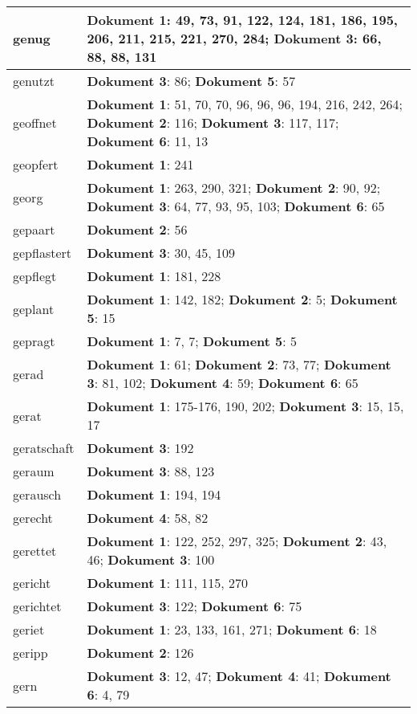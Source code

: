 \documentclass[a5paper]{article}
\begin{document}
\begin{longtable}[l]{|l|p{3in}|}
\hline
genug & \textbf{Dokument 1}: 49, 73, 91, 122, 124, 181, 186, 195, 206, 211, 215, 221, 270, 284; \textbf{Dokument 3}: 66, 88, 88, 131 \\
\hline
genutzt & \textbf{Dokument 3}: 86; \textbf{Dokument 5}: 57 \\
\hline
geoffnet & \textbf{Dokument 1}: 51, 70, 70, 96, 96, 96, 194, 216, 242, 264; \textbf{Dokument 2}: 116; \textbf{Dokument 3}: 117, 117; \textbf{Dokument 6}: 11, 13 \\
\hline
geopfert & \textbf{Dokument 1}: 241 \\
\hline
georg & \textbf{Dokument 1}: 263, 290, 321; \textbf{Dokument 2}: 90, 92; \textbf{Dokument 3}: 64, 77, 93, 95, 103; \textbf{Dokument 6}: 65 \\
\hline
gepaart & \textbf{Dokument 2}: 56 \\
\hline
gepflastert & \textbf{Dokument 3}: 30, 45, 109 \\
\hline
gepflegt & \textbf{Dokument 1}: 181, 228 \\
\hline
geplant & \textbf{Dokument 1}: 142, 182; \textbf{Dokument 2}: 5; \textbf{Dokument 5}: 15 \\
\hline
gepragt & \textbf{Dokument 1}: 7, 7; \textbf{Dokument 5}: 5 \\
\hline
gerad & \textbf{Dokument 1}: 61; \textbf{Dokument 2}: 73, 77; \textbf{Dokument 3}: 81, 102; \textbf{Dokument 4}: 59; \textbf{Dokument 6}: 65 \\
\hline
gerat & \textbf{Dokument 1}: 175-176, 190, 202; \textbf{Dokument 3}: 15, 15, 17 \\
\hline
geratschaft & \textbf{Dokument 3}: 192 \\
\hline
geraum & \textbf{Dokument 3}: 88, 123 \\
\hline
gerausch & \textbf{Dokument 1}: 194, 194 \\
\hline
gerecht & \textbf{Dokument 4}: 58, 82 \\
\hline
gerettet & \textbf{Dokument 1}: 122, 252, 297, 325; \textbf{Dokument 2}: 43, 46; \textbf{Dokument 3}: 100 \\
\hline
gericht & \textbf{Dokument 1}: 111, 115, 270 \\
\hline
gerichtet & \textbf{Dokument 3}: 122; \textbf{Dokument 6}: 75 \\
\hline
geriet & \textbf{Dokument 1}: 23, 133, 161, 271; \textbf{Dokument 6}: 18 \\
\hline
geripp & \textbf{Dokument 2}: 126 \\
\hline
gern & \textbf{Dokument 3}: 12, 47; \textbf{Dokument 4}: 41; \textbf{Dokument 6}: 4, 79 \\

\end{longtable}
\end{document}
